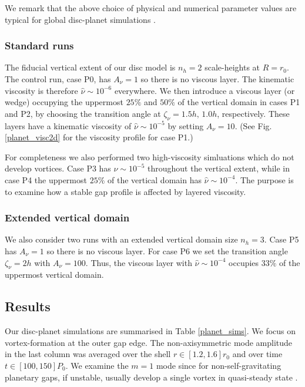 We remark that the above choice of physical and numerical parameter
values are typical for global disc-planet simulations
\citep[e.g.][]{valborro06,mignone12}.  


\subsubsection{Standard runs} 
The fiducial vertical extent of our disc model is $n_h=2$
scale-heights at $R=r_0$.  The control run, case P0, has $A_\nu=1$ so there is 
no viscous layer. The kinematic viscosity is therefore
$\hat{\nu}\sim10^{-6}$  everywhere. We then introduce a viscous
layer (or wedge) occupying the uppermost $25\%$ and $50\%$ of the
vertical domain in cases P1 and P2, by choosing the transition angle
at $\zeta_\nu = 1.5h,\,1.0h$, respectively. These layers have a kinematic 
viscosity of $\hat{\nu}\sim 10^{-5}$ by setting $A_\nu=10$.  (See
Fig. \ref{planet_visc2d} for the viscosity profile for case P1.)  

For completeness we also performed two high-viscosity simluations
which do not develop vortices. Case P3 has $\hat{\nu}\sim10^{-5}$
throughout the vertical extent, while in case P4 the uppermost $25\%$
of the vertical domain has $\hat{\nu}\sim10^{-4}$. The purpose is to
examine how a stable gap profile is affected by layered viscosity. 

\subsubsection{Extended vertical domain}
We also consider two runs with an extended vertical domain size
$n_h=3$. Case P5 has $A_\nu=1$ so there is no viscous layer. For case
P6 we set the transition angle $\zeta_\nu=2h$ with $A_\nu=100$. 
Thus, the viscous layer with $\hat{\nu}\sim10^{-4}$ occupies $33\%$ of
the uppermost vertical domain. 




\subsection{Results}
Our disc-planet simulations are summarised in Table \ref{planet_sims}.
We focus on vortex-formation at the outer gap edge. 
The non-axisymmetric mode amplitude in the last column was 
averaged over the shell $r\in[1.2,1.6]r_0$ and over time 
$t\in[100,150]P_0$. We examine the $m=1$ mode since 
for non-self-gravitating planetary gaps, if unstable, usually develop
a single vortex in quasi-steady state \citep{valborro07,lin10}.   

